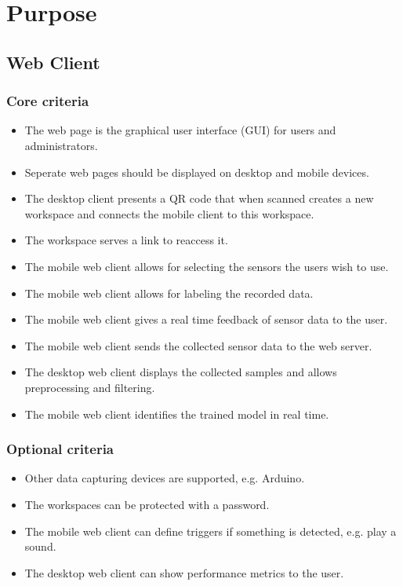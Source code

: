 \section{Purpose}

\subsection{Web Client}
\subsubsection{Core criteria}
\begin{itemize}
    \item The web page is the graphical user interface (GUI) for users and administrators.
    \item Seperate web pages should be displayed on desktop and mobile devices. %
    \item The desktop client presents a QR code that when scanned creates a new workspace and connects the mobile client to
          this workspace.
    \item The workspace serves a link to reaccess it.
    \item The mobile web client allows for selecting the sensors the users wish to use.
    \item The mobile web client allows for labeling the recorded data.
    \item The mobile web client gives a real time feedback of sensor data to the user.
    \item The mobile web client sends the collected sensor data to the web server.
    \item The desktop web client displays the collected samples and allows preprocessing and filtering.
    \item The mobile web client identifies the trained model in real time.
\end{itemize}

\subsubsection{Optional criteria}
\begin{itemize}
    \item Other data capturing devices are supported, e.g. Arduino.
    \item The workspaces can be protected with a password.
    \item The mobile web client can define triggers if something is detected, e.g. play a sound.
    \item The desktop web client can show performance metrics to the user.
\end{itemize}

